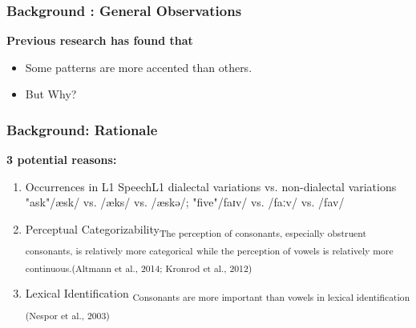 \documentclass{beamer}
\begin{document}
\begin{frame}

\frametitle{Background : General Observations}
\textbf{Previous research has found that }
\begin{itemize}
\item Some patterns are more accented than others.
\item[] But Why?

\end{itemize}
\end{frame}
\begin{frame}
\frametitle{Background: Rationale}
\textbf{3 potential reasons: }\linebreak
\begin{enumerate}
\item{Occurrences in L1 Speech\linebreak L1 dialectal variations vs. non-dialectal variations \linebreak "ask"/æsk/ vs. /æks/ vs. /æskə/; "five"/faɪv/ vs. /faːv/ vs. /fav/}\linebreak
\item{Perceptual Categorizability\linebreak \textsubscript{The perception of consonants, especially obstruent consonants, is relatively more categorical} \linebreak \textsubscript{while the perception of vowels is relatively more continuous.}\linebreak \textsubscript{(Altmann et al., 2014; Kronrod et al., 2012) }}\linebreak
\item{Lexical Identification \linebreak \textsubscript{Consonants are more important than vowels in lexical identification (Nespor et al., 2003)}}

\end{enumerate}
\end{frame}
\end{document}
